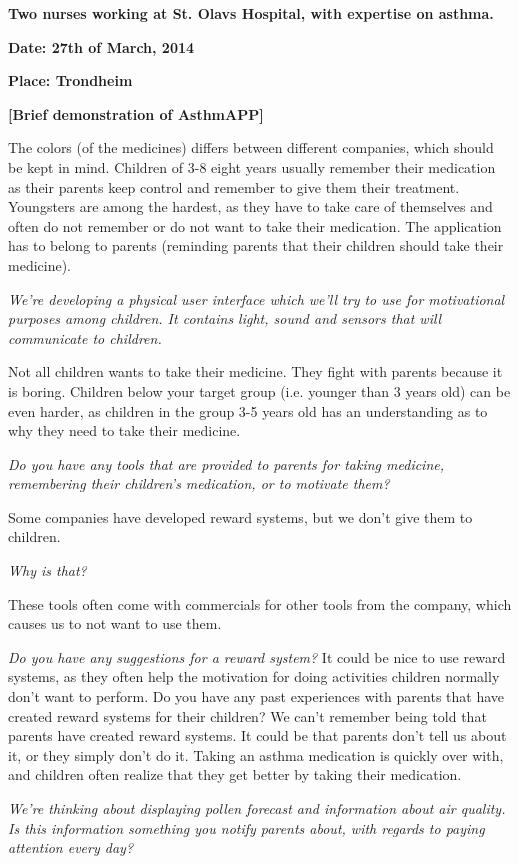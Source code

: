 \textbf{Two nurses working at St. Olavs Hospital, with expertise on asthma.} 

\textbf{Date: 27th of March, 2014}

\textbf{Place: Trondheim}

\textbf{[Brief demonstration of AsthmAPP]}

The colors (of the medicines) differs between different companies, which should be kept in mind. 
Children of 3-8 eight years usually remember their medication as their parents keep control and remember to give them their treatment. 
Youngsters are among the hardest, as they have to take care of themselves and often do not remember or do not want to take their medication. The application has to belong to parents (reminding parents that their children should take their medicine). 

\emph{We're developing a physical user interface which we'll try to use for motivational purposes among children. It contains light, sound and sensors that will communicate to children.} 

Not all children wants to take their medicine. They fight with parents because it is boring. Children below your target group (i.e. younger than 3 years old) can be even harder, as children in the group 3-5 years old has an understanding as to why they need to take their medicine. 

\emph{Do you have any tools that are provided to parents for taking medicine, remembering their children's medication, or to motivate them?}

Some companies have developed reward systems, but we don't give them to children.

\emph{Why is that?}

These tools often come with commercials for other tools from the company, which causes us to not want to use them. 

\emph{Do you have any suggestions for a reward system?}
It could be nice to use reward systems, as they often help the motivation for doing activities children normally don't want to perform.
Do you have any past experiences with parents that have created reward systems for their children?
 We can't remember being told that parents have created reward systems. It could be that parents don't tell us about it, or they simply don't do it. Taking an asthma medication is quickly over with, and children often realize that they get better by taking their medication.

\emph{We're thinking about displaying pollen forecast and information about air quality. Is this information something you notify parents about, with regards to paying attention every day?}

